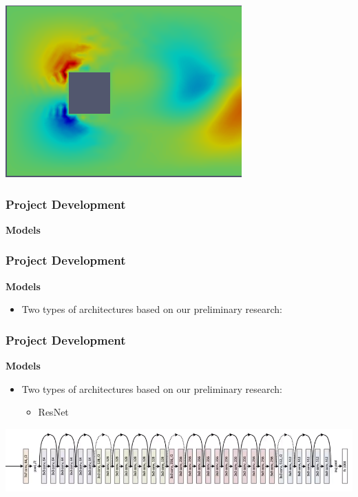 \documentclass[18pt]{beamer}
\begin{document}
\begin{frame}[t]
\begin{center}
    \includegraphics[scale=0.27]{images/y-direction-rgb} \\
  \end{center}  
\end{frame}


\begin{frame}[t]
  \frametitle{Project Development}
  \large{\textbf{Models}}
\end{frame}

\begin{frame}[t]
  \frametitle{Project Development}
  \large{\textbf{Models}}
  \begin{itemize}
  \item Two types of architectures based on our preliminary research:
  \end{itemize}
\end{frame}

\begin{frame}[t]
  \frametitle{Project Development}
  \large{\textbf{Models}}
  \begin{itemize}
  \item Two types of architectures based on our preliminary research:
    \begin{itemize}
    \item ResNet 
    \end{itemize}
  \end{itemize}
  \vspace{1cm}
  \begin{center}
      \includegraphics[scale=0.37]{images/nets/res}
    \end{center}
\end{frame}
\end{document}
